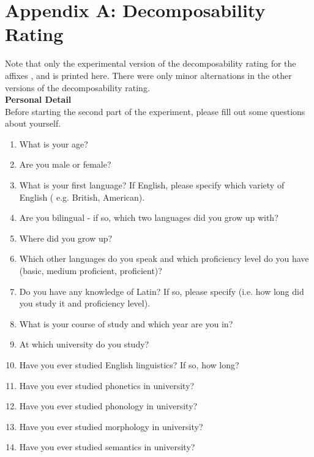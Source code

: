 
\appendix
\addappheadtotoc

\appendixpage

\section*{Appendix A: Decomposability Rating} 

\label{Appendix A: Decomposability Rating}



Note that only the experimental version of the decomposability rating for the affixes ,  and  is printed here. There were only minor alternations in the other versions of the decomposability rating.\\


\noindent \textbf{Personal Detail}\\


\noindent  Before starting the second part of the experiment, please fill out some questions about yourself. \\
\begin{enumerate}

	\item What is your age?
	\item Are you male or female?
	\item What is your first language?  If English, please specify which variety of English ( e.g. British, American).	
	\item Are you bilingual - if so, which two languages did you grow up with?	
	\item Where did you grow up?
	\item Which other languages do you speak and which proficiency level do you have (basic, medium proficient, proficient)?
	\item Do you have any knowledge of Latin? If so, please specify (i.e. how long did you study it and proficiency level).
	\item What is your course of study and which year are you in?
	\item At which university do you study?
	\item Have you ever studied English linguistics? If so, how long?
	\item Have you ever studied phonetics in university?
	\item Have you ever studied phonology in university?
	\item Have you ever studied morphology in university?
	\item Have you ever studied semantics in university?
	
\end{enumerate}



